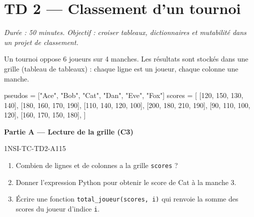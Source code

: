 \section*{TD 2 --- Classement d'un tournoi}
\textit{Durée : 50 minutes. Objectif : croiser tableaux, dictionnaires et mutabilité
dans un projet de classement.}

\bigskip

Un tournoi oppose 6 joueurs sur 4 manches. Les résultats sont stockés dans une
grille (tableau de tableaux) : chaque ligne est un joueur, chaque colonne une manche.

\begin{python}
pseudos = ["Ace", "Bob", "Cat", "Dan", "Eve", "Fox"]
scores = [
    [120, 150, 130, 140],
    [180, 160, 170, 190],
    [110, 140, 120, 100],
    [200, 180, 210, 190],
    [90,  110, 100, 120],
    [160, 170, 150, 180],
]
\end{python}

\textbf{Partie A --- Lecture de la grille (C3)}

\begin{exercice}{1NSI-TC-TD2-A1}{1}{5}
\begin{enumerate}
  \item Combien de lignes et de colonnes a la grille \lstinline{scores} ?
  \item Donner l'expression Python pour obtenir le score de Cat à la manche 3.
  \item Écrire une fonction \lstinline{total_joueur(scores, i)} qui renvoie
        la somme des scores du joueur d'indice \lstinline{i}.
\end{enumerate}
\end{exercice}


